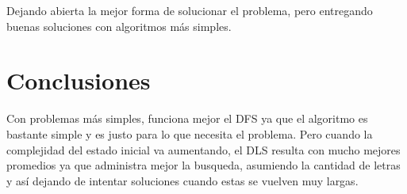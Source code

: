 \documentclass[11pt]{article}
\begin{document}
Dejando abierta la mejor forma de solucionar el problema, pero entregando buenas soluciones con algoritmos más simples.

\section{Conclusiones}
\label{sec:org354be51}

Con problemas más simples, funciona mejor el DFS ya que el algoritmo es bastante
simple y es justo para lo que necesita el problema. Pero cuando la complejidad
del estado inicial va aumentando, el DLS resulta con mucho mejores promedios ya
que administra mejor la busqueda, asumiendo la cantidad de letras y así dejando
de intentar soluciones cuando estas se vuelven muy largas.
\end{document}
